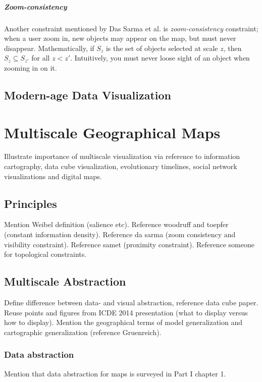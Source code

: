 \documentclass[11pt, oneside]{report}   	%
\begin{document}

\paragraph{Zoom-consistency}
Another constraint mentioned by Das Sarma et al. is  \emph{zoom-consistency} constraint; when a user zoom in, new objects may appear on the map, but must never disappear. Mathematically, if $S_z$ is the set of objects selected at scale $z$, then $S_z \subseteq S_{z'}$ for all $z < z'$. Intuitively, you must never loose sight of an object when zooming in on it.



\section{Modern-age Data Visualization}

\chapter{Multiscale Geographical Maps}
Illustrate importance of multiscale visualization via reference to information cartography, data cube visualization, evolutionary timelines, social network visualizations and digital maps.

\section{Principles}
Mention Weibel definition (salience etc). Reference woodruff and toepfer (constant information density). Reference da sarma (zoom consistency and visibility constraint). Reference samet (proximity constraint). Reference someone for topological constraints.

\section{Multiscale Abstraction}
Define difference between data- and visual abstraction, reference data cube paper. Reuse points and figures from ICDE 2014 presentation (what to display versus how to display). Mention the geographical terms of model generalization and cartographic generalization (reference Gruenreich). 

\subsection{Data abstraction}
Mention that data abstraction for maps is surveyed in Part I chapter 1.
\end{document}
